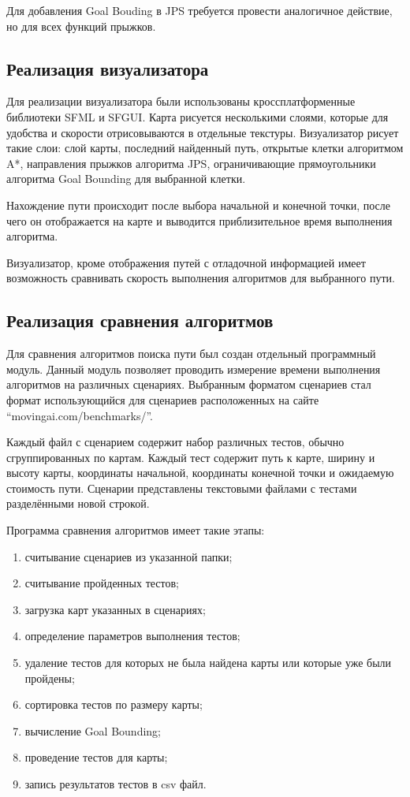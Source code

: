 Для добавления Goal Bouding в JPS требуется провести аналогичное действие, но для всех функций прыжков.

\subsection{Реализация визуализатора}

Для реализации визуализатора были использованы кроссплатформенные библиотеки SFML и SFGUI. Карта рисуется несколькими слоями, которые для удобства и скорости отрисовываются в отдельные текстуры. Визуализатор рисует такие слои: слой карты, последний найденный путь, открытые клетки алгоритмом A*, направления прыжков алгоритма JPS, ограничивающие прямоугольники алгоритма Goal Bounding для выбранной клетки.

Нахождение пути происходит после выбора начальной и конечной точки, после чего он отображается на карте и выводится приблизительное время выполнения алгоритма. 

Визуализатор, кроме отображения путей с отладочной информацией имеет возможность сравнивать скорость выполнения алгоритмов для выбранного пути.

\subsection{Реализация сравнения алгоритмов}

Для сравнения алгоритмов поиска пути был создан отдельный программный модуль. Данный модуль позволяет проводить измерение времени выполнения алгоритмов на различных сценариях. Выбранным форматом сценариев стал формат использующийся для сценариев расположенных на сайте ``movingai.com/benchmarks/''. 

Каждый файл с сценарием содержит набор различных тестов, обычно сгруппированных по картам. Каждый тест содержит путь к карте, ширину и высоту карты, координаты начальной, координаты конечной точки и ожидаемую стоимость пути. Сценарии представлены текстовыми файлами с тестами разделёнными новой строкой.

Программа сравнения алгоритмов имеет такие этапы:

\begin{enumerate}
	\item считывание сценариев из указанной папки;
	\item считывание пройденных тестов;
	\item загрузка карт указанных в сценариях;
	\item определение параметров выполнения тестов;
	\item удаление тестов для которых не была найдена карты или которые уже были пройдены;
	\item сортировка тестов по размеру карты;
	\item вычисление Goal Bounding;
	\item проведение тестов для карты;
	\item запись результатов тестов в csv файл.
\end{enumerate}   

